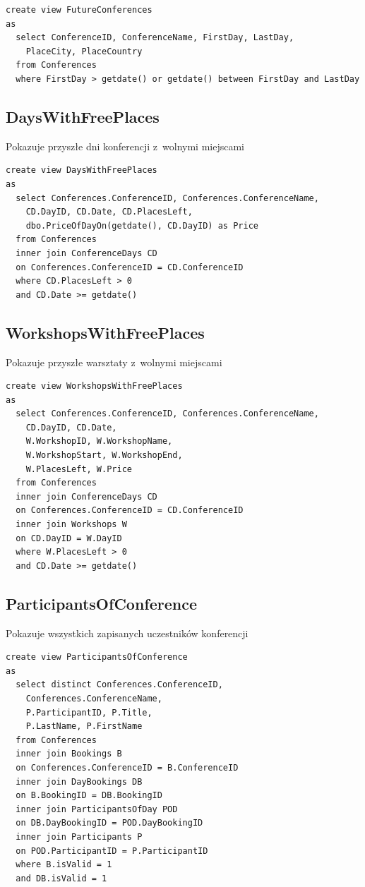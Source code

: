 \documentclass[12pt, a4paper]{mwrep}
\begin{document}
\begin{lstlisting}
create view FutureConferences
as
  select ConferenceID, ConferenceName, FirstDay, LastDay,
    PlaceCity, PlaceCountry
  from Conferences
  where FirstDay > getdate() or getdate() between FirstDay and LastDay
\end{lstlisting}

\subsection{DaysWithFreePlaces}

\noindent Pokazuje przyszłe dni konferencji z~wolnymi miejscami

\begin{lstlisting}
create view DaysWithFreePlaces
as
  select Conferences.ConferenceID, Conferences.ConferenceName, 
    CD.DayID, CD.Date, CD.PlacesLeft, 
    dbo.PriceOfDayOn(getdate(), CD.DayID) as Price
  from Conferences
  inner join ConferenceDays CD 
  on Conferences.ConferenceID = CD.ConferenceID
  where CD.PlacesLeft > 0 
  and CD.Date >= getdate()
\end{lstlisting}

\subsection{WorkshopsWithFreePlaces}

\noindent Pokazuje przyszłe warsztaty z~wolnymi miejscami

\begin{lstlisting}
create view WorkshopsWithFreePlaces
as
  select Conferences.ConferenceID, Conferences.ConferenceName, 
    CD.DayID, CD.Date,
    W.WorkshopID, W.WorkshopName, 
    W.WorkshopStart, W.WorkshopEnd, 
    W.PlacesLeft, W.Price
  from Conferences
  inner join ConferenceDays CD 
  on Conferences.ConferenceID = CD.ConferenceID
  inner join Workshops W 
  on CD.DayID = W.DayID
  where W.PlacesLeft > 0 
  and CD.Date >= getdate()
\end{lstlisting}

\subsection{ParticipantsOfConference}

\noindent Pokazuje wszystkich zapisanych uczestników konferencji

\begin{lstlisting}
create view ParticipantsOfConference
as
  select distinct Conferences.ConferenceID, 
    Conferences.ConferenceName, 
    P.ParticipantID, P.Title, 
    P.LastName, P.FirstName
  from Conferences
  inner join Bookings B 
  on Conferences.ConferenceID = B.ConferenceID
  inner join DayBookings DB 
  on B.BookingID = DB.BookingID
  inner join ParticipantsOfDay POD 
  on DB.DayBookingID = POD.DayBookingID
  inner join Participants P 
  on POD.ParticipantID = P.ParticipantID
  where B.isValid = 1
  and DB.isValid = 1
\end{lstlisting}
\end{document}
